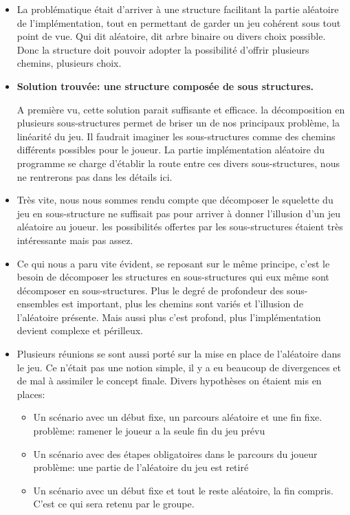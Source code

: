 \begin{itemize}
\item La  problématique était d'arriver à une structure facilitant la partie aléatoire de l'implémentation, tout en permettant de garder un jeu cohérent sous tout point de vue.
Qui dit aléatoire, dit arbre binaire ou divers choix possible. Donc la structure doit pouvoir adopter la possibilité d'offrir plusieurs chemins, plusieurs choix.


\item \textbf{Solution trouvée: une structure composée de sous structures.}


A première vu, cette solution parait suffisante et efficace. la décomposition en plusieurs sous-structures permet de briser un de nos principaux problème, la linéarité du jeu. Il faudrait imaginer les sous-structures comme des chemins différents possibles pour le joueur. La partie implémentation aléatoire du programme se charge d'établir la route entre ces divers sous-structures, nous ne rentrerons pas dans les détails ici.


\item Très vite, nous nous sommes rendu compte que décomposer le squelette du jeu en sous-structure ne suffisait pas pour arriver à donner l'illusion d'un jeu aléatoire au joueur. les possibilités offertes par les sous-structures étaient très intéressante mais pas assez.


\item Ce qui nous a paru vite évident, se reposant sur le même principe, c'est le besoin de décomposer les structures en sous-structures qui eux même sont décomposer en sous-structures. Plus le degré de profondeur des sous-ensembles est important, plus les chemins sont variés et l'illusion de l'aléatoire présente. Mais aussi plus c'est profond, plus l'implémentation devient complexe et périlleux.


\item Plusieurs réunions se sont aussi porté sur la mise en place de l'aléatoire dans le jeu. Ce n'était pas une notion simple, il y a eu beaucoup de divergences et de mal à assimiler le concept finale. 
Divers hypothèses on étaient mis en places: 
  \begin{itemize}
  \item Un scénario avec un début fixe, un parcours aléatoire et une fin fixe.
  \newline
  problème: ramener le joueur a la seule fin du jeu prévu
  \item Un scénario avec des étapes obligatoires dans le parcours du joueur
  \newline
  problème: une partie de l'aléatoire du jeu est retiré
  \item Un scénario avec un début fixe et tout le reste aléatoire, la fin compris.
  \newline
  C'est ce qui sera retenu par le groupe.
  \end{itemize}


\end{itemize}
